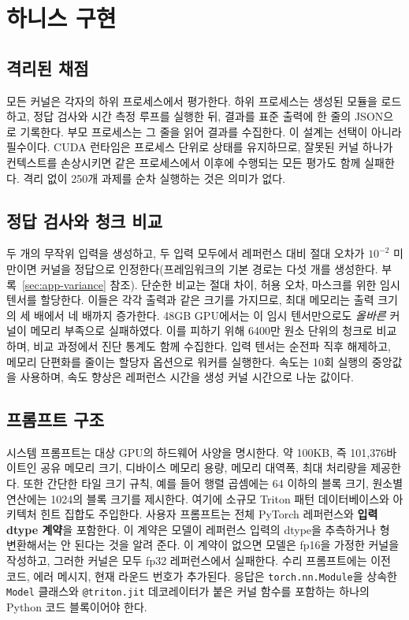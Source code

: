 
\section{하니스 구현}

\subsection{격리된 채점}
모든 커널은 각자의 하위 프로세스에서 평가한다. 하위 프로세스는 생성된 모듈을 로드하고,
정답 검사와 시간 측정 루프를 실행한 뒤, 결과를 표준 출력에 한 줄의 JSON으로 기록한다.
부모 프로세스는 그 줄을 읽어 결과를 수집한다. 이 설계는 선택이 아니라 필수이다.
CUDA 런타임은 프로세스 단위로 상태를 유지하므로, 잘못된 커널 하나가 컨텍스트를 손상시키면
같은 프로세스에서 이후에 수행되는 모든 평가도 함께 실패한다. 격리 없이 250개 과제를
순차 실행하는 것은 의미가 없다.

\subsection{정답 검사와 청크 비교}
두 개의 무작위 입력을 생성하고, 두 입력 모두에서 레퍼런스 대비 절대 오차가 $10^{-2}$ 미만이면
커널을 정답으로 인정한다(프레임워크의 기본 경로는 다섯 개를 생성한다. 부록~\ref{sec:app-variance} 참조). 단순한 비교는 절대 차이,
허용 오차, 마스크를 위한 임시 텐서를 할당한다. 이들은 각각 출력과 같은 크기를 가지므로, 최대 메모리는
출력 크기의 세 배에서 네 배까지 증가한다. 48GB GPU에서는 이 임시 텐서만으로도 \emph{올바른}
커널이 메모리 부족으로 실패하였다. 이를 피하기 위해 6400만 원소 단위의 청크로 비교하며,
비교 과정에서 진단 통계도 함께 수집한다. 입력 텐서는 순전파 직후 해제하고, 메모리 단편화를
줄이는 할당자 옵션으로 워커를 실행한다. 속도는 10회 실행의 중앙값을 사용하며, 속도 향상은
레퍼런스 시간을 생성 커널 시간으로 나눈 값이다.

\subsection{프롬프트 구조}
시스템 프롬프트는 대상 GPU의 하드웨어 사양을 명시한다. 약 100KB, 즉 101{,}376바이트인 공유
메모리 크기, 디바이스 메모리 용량, 메모리 대역폭, 최대 처리량을 제공한다. 또한 간단한 타일 크기
규칙, 예를 들어 행렬 곱셈에는 64 이하의 블록 크기, 원소별 연산에는 1024의 블록 크기를 제시한다.
여기에 소규모 Triton 패턴 데이터베이스와 아키텍처 힌트 집합도 주입한다. 사용자 프롬프트는
전체 PyTorch 레퍼런스와 \textbf{입력 dtype 계약}을 포함한다. 이 계약은 모델이 레퍼런스 입력의
dtype을 추측하거나 형 변환해서는 안 된다는 것을 알려 준다. 이 계약이 없으면 모델은 fp16을 가정한
커널을 작성하고, 그러한 커널은 모두 fp32 레퍼런스에서 실패한다. 수리 프롬프트에는 이전 코드,
에러 메시지, 현재 라운드 번호가 추가된다. 응답은 \texttt{torch.nn.Module}을 상속한
\texttt{Model} 클래스와 \texttt{@triton.jit} 데코레이터가 붙은 커널 함수를 포함하는 하나의
Python 코드 블록이어야 한다.


